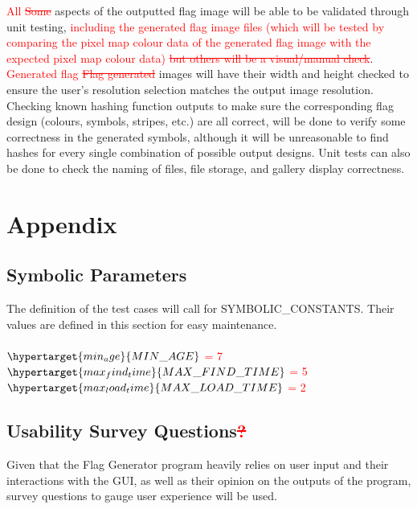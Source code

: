 \documentclass[12pt, titlepage]{article}
\begin{document}
\noindent \textcolor{red}{All \sout{Some}} aspects of the outputted flag image
will be able to be validated through unit testing, \textcolor{red}{including
the generated flag image files (which will be tested by comparing the pixel
map colour data of the generated flag image with the expected pixel map colour
data) \sout{but others will be a visual/manual check}}. \textcolor{red}{
Generated flag \sout{Flag generated}} images will have their width and height
checked to ensure the user's resolution selection matches the output image
resolution. Checking known hashing function outputs to make sure the
corresponding flag design (colours, symbols, stripes, etc.) are all correct,
will be done to verify some correctness in the generated symbols, although it
will be unreasonable to find hashes for every single combination of possible
output designs. Unit tests can also be done to check the naming of files, file
storage, and gallery display correctness.





\newpage

\section{Appendix}

\subsection{Symbolic Parameters}
The definition of the test cases will call for SYMBOLIC\_CONSTANTS. Their values are defined in this section for easy maintenance. \\ \\
\textcolor{red}{$\hypertarget{min_age}{MIN\_AGE}$ = 7} \\
\textcolor{red}{$\hypertarget{max_find_time}{MAX\_FIND\_TIME}$ = 5} \\
\textcolor{red}{$\hypertarget{max_load_time}{MAX\_LOAD\_TIME}$ = 2} \\

\subsection{Usability Survey Questions\textcolor{red}{\sout{?}}}

Given that the Flag Generator program heavily relies on user input and their
interactions with the GUI, as well as their opinion on the outputs of the
program, survey questions to gauge user experience will be used.
\end{document}
